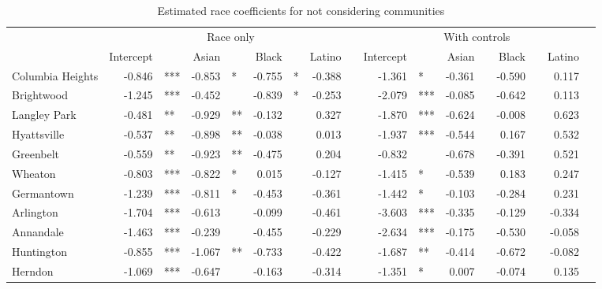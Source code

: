 % 
\begin{sidewaystable}[ht]
\centering
\caption{Estimated race coefficients for not considering communities} 
\label{tab:notconsider}
\begin{tabular}{lrlrlrlrlrlrlrlrl}
  \toprule
  & \multicolumn{8}{c}{Race only} & \multicolumn{8}{c}{With controls}\\
 & Intercept && Asian && Black && Latino&& Intercept && Asian && Black && Latino&\\
 \midrule
Columbia Heights & -0.846 & *** & -0.853 & * & -0.755 & * & -0.388 &  & -1.361 & * & -0.361 &  & -0.590 &  & 0.117 &  \\ 
  Brightwood & -1.245 & *** & -0.452 &  & -0.839 & * & -0.253 &  & -2.079 & *** & -0.085 &  & -0.642 &  & 0.113 &  \\ 
  Langley Park & -0.481 & ** & -0.929 & ** & -0.132 &  & 0.327 &  & -1.870 & *** & -0.624 &  & -0.008 &  & 0.623 &  \\ 
  Hyattsville & -0.537 & ** & -0.898 & ** & -0.038 &  & 0.013 &  & -1.937 & *** & -0.544 &  & 0.167 &  & 0.532 &  \\ 
  Greenbelt & -0.559 & ** & -0.923 & ** & -0.475 &  & 0.204 &  & -0.832 &  & -0.678 &  & -0.391 &  & 0.521 &  \\ 
  Wheaton & -0.803 & *** & -0.822 & * & 0.015 &  & -0.127 &  & -1.415 & * & -0.539 &  & 0.183 &  & 0.247 &  \\ 
  Germantown & -1.239 & *** & -0.811 & * & -0.453 &  & -0.361 &  & -1.442 & * & -0.103 &  & -0.284 &  & 0.231 &  \\ 
  Arlington & -1.704 & *** & -0.613 &  & -0.099 &  & -0.461 &  & -3.603 & *** & -0.335 &  & -0.129 &  & -0.334 &  \\ 
  Annandale & -1.463 & *** & -0.239 &  & -0.455 &  & -0.229 &  & -2.634 & *** & -0.175 &  & -0.530 &  & -0.058 &  \\ 
  Huntington & -0.855 & *** & -1.067 & ** & -0.733 &  & -0.422 &  & -1.687 & ** & -0.414 &  & -0.672 &  & -0.082 &  \\ 
  Herndon & -1.069 & *** & -0.647 &  & -0.163 &  & -0.314 &  & -1.351 & * & 0.007 &  & -0.074 &  & 0.135 &  \\ 
   \bottomrule
\end{tabular}
\end{sidewaystable}
